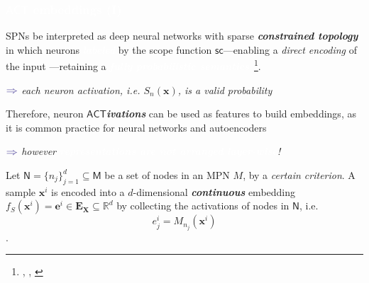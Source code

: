 \documentclass[xcolor={usenames,dvipsnames,svgnames}, compress]{beamer}
\newcommand{\nodeset}[1]{\bm{\mathsf{#1}}}
\newcommand{\highlighttext}[2][yellow]{{\colorbox{#1}{\textcolor{white}{#2}}}}
\newcommand{\customcite}[1]{\footnote{\tiny \citeauthor{#1}, \citetitle{#1}, \citeyear{#1}}}
\begin{document}
\begin{frame}[t]
  \frametitle{\highlighttext[bgrey2]{$\mathsf{ACT}$ embeddings (I)}}
  \footnotesize
SPNs  be interpreted as deep neural networks
with sparse \textbf{\emph{constrained topology}} in which neurons \highlighttext[tomato0]{{\textbf{\emph{labeled}}}} by the scope function $\mathsf{sc}$---enabling a \emph{direct encoding} of the input%
---retaining a \highlighttext[tomato0]{\emph{\textbf{fully probabilistic
semantics}}}~\customcite{Vergari2016a}.
\begin{minipage}{1.0\linewidth}
      \raggedleft
      $\color{violet}\boldsymbol\Rightarrow$
      \scriptsize
     \emph{each neuron activation, i.e. $S_{n}(\mathbf{x})$, is a valid probability}
\end{minipage}\par\bigskip

Therefore, neuron \emph{\textbf{$\mathsf{ACT}$ivations}} can be used
as features to build embeddings, 
as it is common practice for neural networks and
autoencoders~\parencite{Rifai2011,Marlin2010}
\begin{minipage}{1.0\linewidth}
      \raggedleft
      $\color{violet}\boldsymbol\Rightarrow$
      \scriptsize
     \emph{however \highlighttext[tomato0]{\emph{\textbf{representations are not arranged layer-wise}}}!}
\end{minipage}\par\bigskip

Let $\nodeset{N}=\{n_{j}\}_{j=1}^{d}\subseteq\nodeset{M}$
 be a set of nodes
in an MPN $M$, by a \emph{certain criterion}.
A sample $\mathbf{x}^{i}$ is encoded into a $d$-dimensional
\textbf{\emph{continuous}} embedding
$f_{S}(\mathbf{x}^{i}) = \mathbf{e}^{i}\in\mathbf{E}_{\mathbf{X}}\subseteq\mathbb{R}^{d}$
by collecting the activations of nodes in $\nodeset{N}$, i.e.
$$e_{j}^{i}=M_{n_{j}}(\mathbf{x}^{i})$$.

\end{frame}
\end{document}

